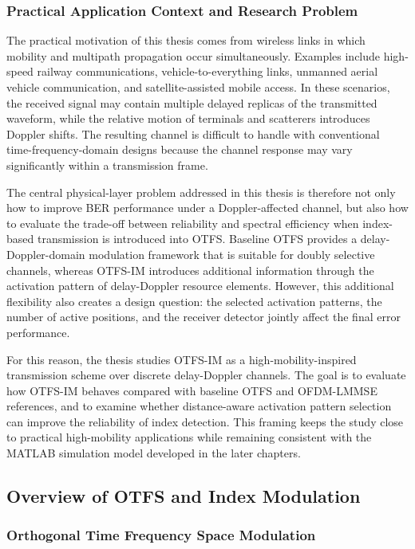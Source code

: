 \subsubsection{Practical Application Context and Research Problem}

The practical motivation of this thesis comes from wireless links in which mobility and multipath propagation occur simultaneously. Examples include high-speed railway communications, vehicle-to-everything links, unmanned aerial vehicle communication, and satellite-assisted mobile access. In these scenarios, the received signal may contain multiple delayed replicas of the transmitted waveform, while the relative motion of terminals and scatterers introduces Doppler shifts. The resulting channel is difficult to handle with conventional time-frequency-domain designs because the channel response may vary significantly within a transmission frame.

The central physical-layer problem addressed in this thesis is therefore not only how to improve BER performance under a Doppler-affected channel, but also how to evaluate the trade-off between reliability and spectral efficiency when index-based transmission is introduced into OTFS. Baseline OTFS provides a delay-Doppler-domain modulation framework that is suitable for doubly selective channels, whereas OTFS-IM introduces additional information through the activation pattern of delay-Doppler resource elements. However, this additional flexibility also creates a design question: the selected activation patterns, the number of active positions, and the receiver detector jointly affect the final error performance.

For this reason, the thesis studies OTFS-IM as a high-mobility-inspired transmission scheme over discrete delay-Doppler channels. The goal is to evaluate how OTFS-IM behaves compared with baseline OTFS and OFDM-LMMSE references, and to examine whether distance-aware activation pattern selection can improve the reliability of index detection. This framing keeps the study close to practical high-mobility applications while remaining consistent with the MATLAB simulation model developed in the later chapters.

\subsection{Overview of OTFS and Index Modulation}

\subsubsection{Orthogonal Time Frequency Space Modulation}

